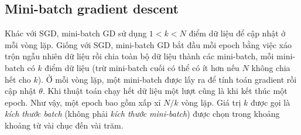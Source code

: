 





\subsection{Mini-batch gradient descent}
Khác với SGD, mini-batch GD sử dụng $1 < k < N$ điểm dữ liệu để cập nhật ở mỗi
vòng lặp. Giống với SGD, mini-batch GD bắt đầu mỗi epoch bằng việc xáo trộn ngẫu
nhiên dữ liệu rồi chia toàn bộ dữ liệu thành các {mini-batch}, mỗi {mini-batch}
có $k$ điểm dữ liệu (trừ mini-batch cuối có thể có ít hơn nếu $N$ không chia hết
cho $k$). Ở mỗi vòng lặp, một mini-batch được lấy ra để tính toán gradient rồi
cập nhật $\theta$. Khi thuật toán chạy hết dữ liệu một lượt cũng là khi kết thúc
một epoch. Như vậy, {một epoch} bao gồm xấp xỉ $N/k$ vòng lặp. Giá trị $k$ được
gọi là \textit{kích thước batch} (không phải \textit{kích thước mini-batch}) được chọn trong khoảng khoảng từ vài chục đến vài trăm.

